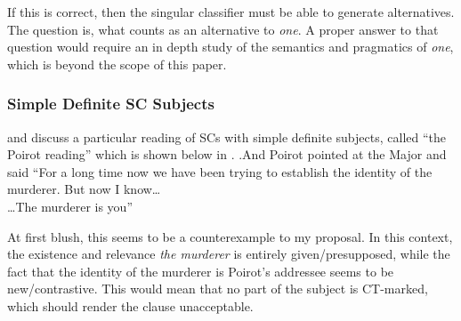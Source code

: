 \documentclass[GPFinal]{subfiles}
\begin{document}
If this is correct, then the singular classifier must be able to generate alternatives.
The question is, what counts as an alternative to \textit{one}.
A proper answer to that question would require an in depth study of the semantics and pragmatics of \textit{one}, which is beyond the scope of this paper.
%
%

\subsubsection{Simple Definite SC Subjects}

\textcite{heycock2010variability} and \textcite{bejarkahnemuyipour2013agreement} discuss a particular reading of SCs with simple definite subjects, called ``the Poirot reading'' which is shown below in \Next.
\ex.And Poirot pointed at the Major and said ``For a long time now we have been trying to establish the identity of the murderer. But now I know\ldots\\
\ldots The murderer is you''

At first blush, this seems to be a counterexample to my proposal.
In this context, the existence and relevance \textit{the murderer} is entirely given/presupposed, while the fact that the identity of the murderer is Poirot's addressee seems to be new/contrastive. 
This would mean that no part of the subject is CT-marked, which should render the clause unacceptable.
\end{document}
